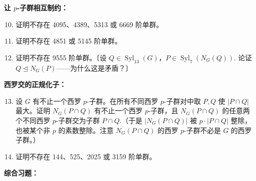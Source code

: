 \noindent\textbf{让 \(p\)-子群相互制约：}

\begin{enumerate}\setcounter{enumi}{9}
\item 证明不存在 4095、4389、5313 或 6669 阶单群。

\item 证明不存在 4851 或 5145 阶单群。

\item 证明不存在 9555 阶单群。〔设 \(Q \in \operatorname{Syl}_{13}(G)\)，\(P \in \operatorname{Syl}_7(N_G(Q))\). 论证 \(Q \trianglelefteq N_G(P)\)——为什么这是矛盾？〕
\end{enumerate}

\noindent\textbf{西罗交的正规化子：}

\begin{enumerate}\setcounter{enumi}{12}
\item 设 \(G\) 有不止一个西罗 \(p\)-子群。在所有不同西罗 \(p\)-子群对中取 \(P, Q\) 使 \(|P \cap Q|\) 最大。证明 \(N_G(P \cap Q)\) 有不止一个西罗 \(p\)-子群，且 \(N_G(P \cap Q)\) 的任意两个不同西罗 \(p\)-子群交为子群 \(P \cap Q\).（于是 \(|N_G(P \cap Q)|\) 被 \(p \cdot |P \cap Q|\) 整除，也被某个非 \(p\) 的素数整除。注意 \(N_G(P \cap Q)\) 的西罗 \(p\)-子群不必是 \(G\) 的西罗子群。）

\item 证明不存在 144、525、2025 或 3159 阶单群。
\end{enumerate}

\noindent\textbf{综合习题：}

